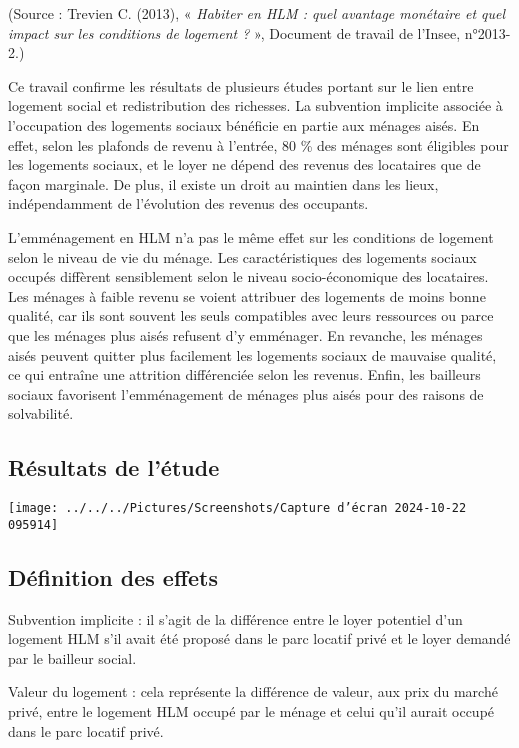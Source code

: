 \documentclass[a4paper, 12pt]{report}
\begin{document}
(Source : Trevien C. (2013), « \textit{Habiter en HLM : quel avantage monétaire et quel impact sur les conditions de logement ?} », Document de travail de l’Insee, n°2013-2.)

Ce travail confirme les résultats de plusieurs études portant sur le lien entre logement social et redistribution des richesses. La subvention implicite associée à l’occupation des logements sociaux bénéficie en partie aux ménages aisés. En effet, selon les plafonds de revenu à l’entrée, 80 \% des ménages sont éligibles pour les logements sociaux, et le loyer ne dépend des revenus des locataires que de façon marginale. De plus, il existe un droit au maintien dans les lieux, indépendamment de l’évolution des revenus des occupants.

L’emménagement en HLM n’a pas le même effet sur les conditions de logement selon le niveau de vie du ménage. Les caractéristiques des logements sociaux occupés diffèrent sensiblement selon le niveau socio-économique des locataires. Les ménages à faible revenu se voient attribuer des logements de moins bonne qualité, car ils sont souvent les seuls compatibles avec leurs ressources ou parce que les ménages plus aisés refusent d’y emménager. En revanche, les ménages aisés peuvent quitter plus facilement les logements sociaux de mauvaise qualité, ce qui entraîne une attrition différenciée selon les revenus. Enfin, les bailleurs sociaux favorisent l’emménagement de ménages plus aisés pour des raisons de solvabilité.

\subsection{Résultats de l'étude}

\begin{center}
	\texttt{[image: ../../../Pictures/Screenshots/Capture d'écran 2024-10-22 095914]}
\end{center}

\subsection{Définition des effets}

Subvention implicite : il s'agit de la différence entre le loyer potentiel d’un logement HLM s’il avait été proposé dans le parc locatif privé et le loyer demandé par le bailleur social.

Valeur du logement : cela représente la différence de valeur, aux prix du marché privé, entre le logement HLM occupé par le ménage et celui qu’il aurait occupé dans le parc locatif privé.
\end{document}
